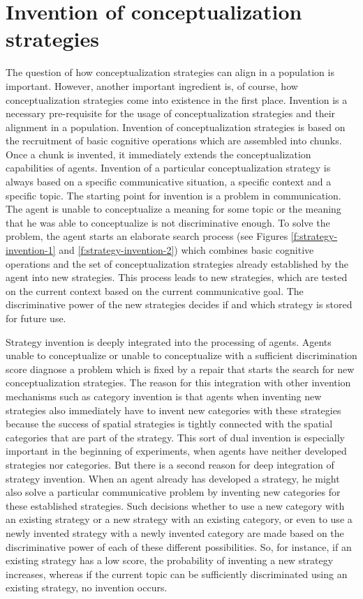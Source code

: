 \section{Invention of conceptualization strategies}
The question of how conceptualization strategies can align in a population is important.
However, another important ingredient is, of course, how conceptualization strategies come
into existence in the first place. Invention is a necessary pre-requisite for the usage of
conceptualization strategies and their alignment in a population. 
Invention of conceptualization strategies is based on the recruitment of basic cognitive operations
which are assembled into chunks. Once a chunk is invented, it immediately extends the conceptualization capabilities of agents. 
Invention of a particular conceptualization strategy is always 
based on a specific communicative situation, a specific context and a specific topic. 
The starting point for invention is a problem in communication. The agent is unable to conceptualize a 
meaning for some topic or the meaning that he was able to conceptualize is not discriminative enough. 
To solve the problem, the agent starts an elaborate search process (see Figures \ref{f:strategy-invention-1}
and \ref{f:strategy-invention-2})
which combines basic cognitive operations and the set of conceptualization 
strategies already established by the agent into new strategies. This process 
leads to new strategies, which are tested on the current context based on the
current communicative goal. The discriminative power of the new strategies decides if and
which strategy is stored for future use.

Strategy invention is deeply integrated into the processing of agents. 
Agents unable to conceptualize or unable to conceptualize with a sufficient discrimination
score diagnose a problem which is fixed by a repair that starts the search for new
conceptualization strategies.  The reason for this integration
with other invention mechanisms such as category invention is 
that agents when inventing new strategies also immediately have to invent new categories with
these strategies because the success of spatial strategies is tightly connected with the
spatial categories that are part of the strategy. This sort of dual invention 
is especially important in the beginning of experiments, when agents have neither developed 
strategies nor categories. But there is a second reason for deep integration of strategy invention. 
When an agent already has developed a strategy, he might also solve a particular
communicative problem by inventing new categories for these established strategies. 
Such decisions whether to use a new category
with an existing strategy or a new strategy with an existing category, or even to use
a newly invented strategy with a newly invented category are made based on the discriminative
power of each of these different possibilities. So, for instance, if an existing strategy has a low score,
the probability of inventing a new strategy increases, whereas if the current topic 
can be sufficiently discriminated using an existing strategy, no invention occurs.

